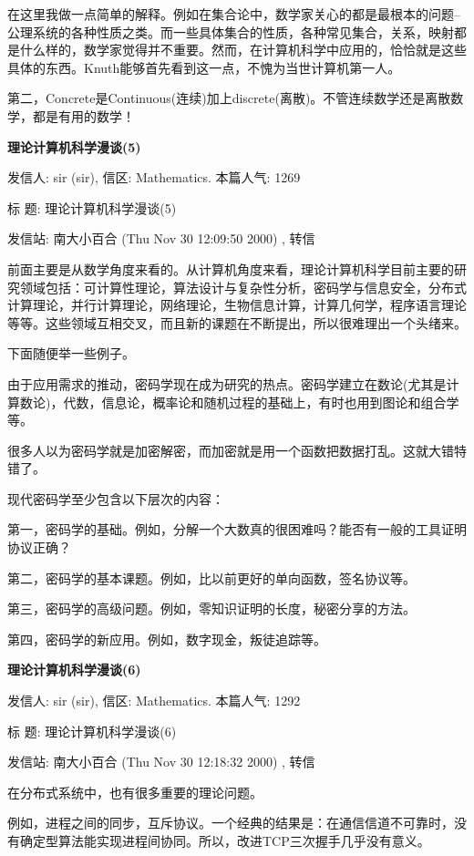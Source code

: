 在这里我做一点简单的解释。例如在集合论中，数学家关心的都是最根本的问题--公理系统的各种性质之类。而一些具体集合的性质，各种常见集合，关系，映射都是什么样的，数学家觉得并不重要。然而，在计算机科学中应用的，恰恰就是这些具体的东西。Knuth能够首先看到这一点，不愧为当世计算机第一人。

第二，Concrete是Continuous(连续)加上discrete(离散)。不管连续数学还是离散数学，都是有用的数学！


\textbf{理论计算机科学漫谈(5)}



发信人: sir (sir), 信区: Mathematics. 本篇人气: 1269

标  题: 理论计算机科学漫谈(5)\cite{tcs5}

发信站: 南大小百合 (Thu Nov 30 12:09:50 2000) , 转信


前面主要是从数学角度来看的。从计算机角度来看，理论计算机科学目前主要的研究领域包括：可计算性理论，算法设计与复杂性分析，密码学与信息安全，分布式计算理论，并行计算理论，网络理论，生物信息计算，计算几何学，程序语言理论等等。这些领域互相交叉，而且新的课题在不断提出，所以很难理出一个头绪来。

下面随便举一些例子。

由于应用需求的推动，密码学现在成为研究的热点。密码学建立在数论(尤其是计算数论)，代数，信息论，概率论和随机过程的基础上，有时也用到图论和组合学等。

很多人以为密码学就是加密解密，而加密就是用一个函数把数据打乱。这就大错特错了。

现代密码学至少包含以下层次的内容：

第一，密码学的基础。例如，分解一个大数真的很困难吗？能否有一般的工具证明协议正确？

第二，密码学的基本课题。例如，比以前更好的单向函数，签名协议等。

第三，密码学的高级问题。例如，零知识证明的长度，秘密分享的方法。

第四，密码学的新应用。例如，数字现金，叛徒追踪等。

\textbf{理论计算机科学漫谈(6)}

发信人: sir (sir), 信区: Mathematics. 本篇人气: 1292

标  题: 理论计算机科学漫谈(6)\cite{tcs6}

发信站: 南大小百合 (Thu Nov 30 12:18:32 2000) , 转信



在分布式系统中，也有很多重要的理论问题。

例如，进程之间的同步，互斥协议。一个经典的结果是：在通信信道不可靠时，没有确定型算法能实现进程间协同。所以，改进TCP三次握手几乎没有意义。

